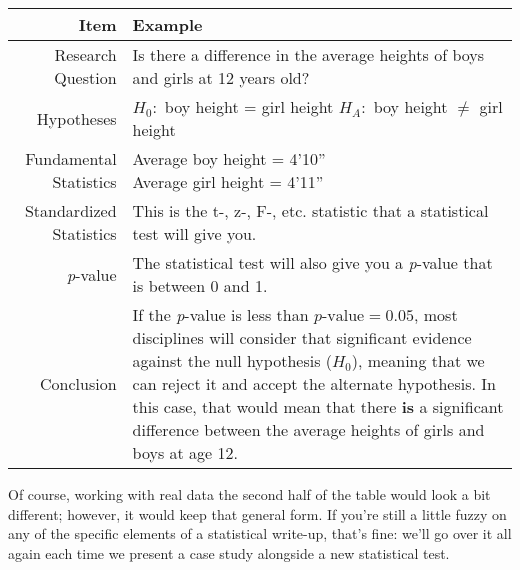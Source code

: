 \begin{center}
\begin{tabular}{r l}
Item & Example \\
\hline
Research Question & Is there a difference in the average heights of boys and girls at 12 years old?\\
Hypotheses & \parbox[t]{25pc}{\(H_0:\) boy height = girl height\\\(H_A:\) boy height \(\neq\) girl height}\\
Fundamental Statistics & \parbox[t]{25pc}{Average boy height = 4'10'' \\ Average girl height = 4'11''}\\
Standardized Statistics & This is the t-, z-, F-, etc. statistic that a statistical test will give you.\\
\textit{p}-value & The statistical test will also give you a \textit{p}-value that is between 0 and 1.\\
Conclusion & \parbox[t]{25pc}{If the \textit{p}-value is less than $p\text{-value}=0.05$, most disciplines will consider that significant evidence against the null hypothesis (\(H_0\)), meaning that we can reject it and accept the alternate hypothesis. In this case, that would mean that there \textbf{is} a significant difference between the average heights of girls and boys at age 12.}
\end{tabular}
\end{center}

Of course, working with real data the second half of the table would look a bit different; however, it would keep that general form. If you're still a little fuzzy on any of the specific elements of a statistical write-up, that's fine: we'll go over it all again each time we present a case study alongside a new statistical test.